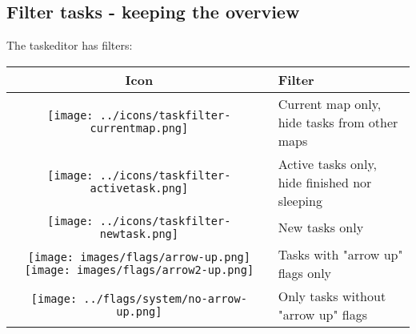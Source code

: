 \documentclass[12pt,a4paper]{article}
\begin{document}
\subsection{Filter tasks - keeping the overview}
The taskeditor has filters:  %
\begin{center}
    \begin{tabular}{|c|p{11cm}|} \hline
        {\bf Icon} &   {\bf Filter }   \\ \hline
        \texttt{[image: ../icons/taskfilter-currentmap.png]} &
             Current map only, hide tasks from other maps \\
        \texttt{[image: ../icons/taskfilter-activetask.png]} &
            Active tasks only, hide finished nor sleeping \\
        \texttt{[image: ../icons/taskfilter-newtask.png]} &
             New tasks only \\
        \texttt{[image: images/flags/arrow-up.png]}
        \texttt{[image: images/flags/arrow2-up.png]} &
            Tasks with "arrow up" flags only        \\
        \texttt{[image: ../flags/system/no-arrow-up.png]} &
            Only tasks without "arrow up" flags \\ \hline
    \end{tabular}
\end{center}
\end{document}
